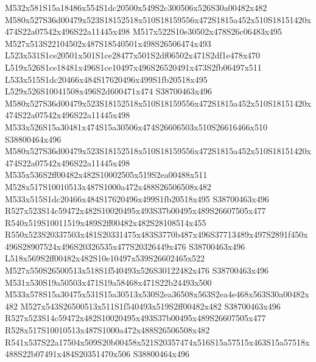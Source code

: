 \documentclass{article}
\begin{document}
\begin{multicols}{2}
M532x581S15a18486x554S1dc20500x549S2c300506x526S30a00482x482 M580x527S36d00479x523S18152518x510S18159556x472S1815a452x510S18151420x474S22a07542x496S22a11445x498 M517x522S10e30502x478S26c06483x495 M527x513S22104502x487S18540501x498S26506474x493 L523x531S1ce20501x501S1ce28477x501S2df06502x471S2df1e478x470 L519x526S1ce18481x496S1ce10497x496S26520491x473S2fb06497x511 L533x515S1dc20466x484S17620496x499S1fb20518x495 L529x526S10041508x496S2d600471x474 S38700463x496 M580x527S36d00479x523S18152518x510S18159556x472S1815a452x510S18151420x474S22a07542x496S22a11445x498 M533x526S15a30481x474S15a30506x474S26606503x510S26616466x510 S38800464x496 M580x527S36d00479x523S18152518x510S18159556x472S1815a452x510S18151420x474S22a07542x496S22a11445x498 M535x536S2ff00482x482S10002505x519S2ea00488x511 M528x517S10010513x487S1000a472x488S26506508x482 M533x515S1dc20466x484S17620496x499S1fb20518x495 S38700463x496 R527x523S14c59472x482S10020495x493S37b00495x489S26607505x477 R540x519S10011519x489S2ff00482x482S28108514x455 R550x523S20337503x481S20331475x483S3770b487x496S37713489x497S2891f450x496S28907524x496S20326535x477S20326449x476 S38700463x496 L518x569S2ff00482x482S10e10497x539S26602465x522 M527x550S26500513x518S1f540493x526S30122482x476 S38700463x496 M531x530S19a50503x471S19a58468x471S22b24493x500 M533x578S15a30475x531S15a30513x530S2ea36508x563S2ea4e468x563S30a00482x482 M527x543S26500513x511S1f540493x519S2ff00482x482 S38700463x496 R527x523S14c59472x482S10020495x493S37b00495x489S26607505x477 R528x517S10010513x487S1000a472x488S26506508x482 R541x537S22a17504x509S20b00458x521S20357474x516S15a57515x463S15a57518x488S22b07491x484S20351470x506 S38800464x496






\end{multicols}
\end{document}
